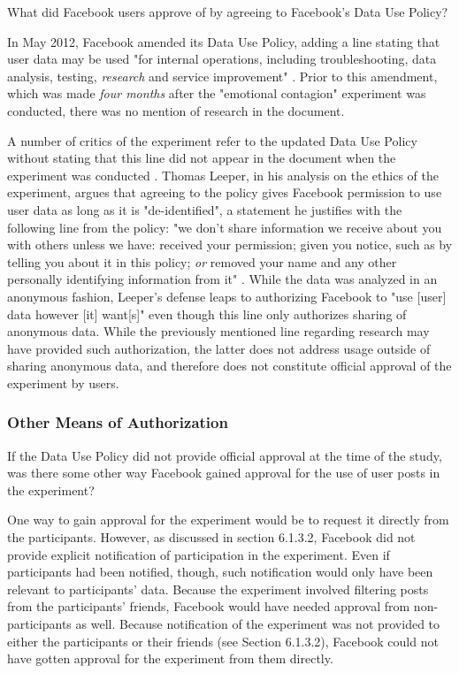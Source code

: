 What did Facebook users approve of by agreeing to Facebook's Data Use Policy? \par 
In May 2012, Facebook amended its Data Use Policy, adding a line stating that user data may be used "for internal operations, including troubleshooting, data analysis, testing, \textit{research} and service improvement" \cite{forbes}.  Prior to this amendment, which was made \textit{four months} after the "emotional contagion" experiment was conducted, there was no mention of research in the document. \par 
A number of critics of the experiment refer to the updated Data Use Policy without stating that this line did not appear in the document when the experiment was conducted \cite{forbes}.  Thomas Leeper, in his analysis on the ethics of the experiment, argues that agreeing to the policy gives Facebook permission to use user data as long as it is "de-identified", a statement he justifies with the following line from the policy: "we don't share information we receive about you with others unless we have: received your permission; given you notice, such as by telling you about it in this policy; \textit{or} removed your name and any other personally identifying information from it" \cite{leeper}.  While the data was analyzed in an anonymous fashion, Leeper's defense leaps to authorizing Facebook to "use [user] data however [it] want[s]" even though this line only authorizes sharing of anonymous data.  While the previously mentioned line regarding research may have provided such authorization, the latter does not address usage outside of sharing anonymous data, and therefore does not constitute official approval of the experiment by users. 

\subsubsection{Other Means of Authorization}
If the Data Use Policy did not provide official approval at the time of the study, was there some other way Facebook gained approval for the use of user posts in the experiment? \par
One way to gain approval for the experiment would be to request it directly from the participants.  However, as discussed in section 6.1.3.2, Facebook did not provide explicit notification of participation in the experiment.  Even if participants had been notified, though, such notification would only have been relevant to participants' data.  Because the experiment involved filtering posts from the participants' friends, Facebook would have needed approval from non-participants as well.  Because notification of the experiment was not provided to either the participants or their friends (see Section 6.1.3.2), Facebook could not have gotten approval for the experiment from them directly.

